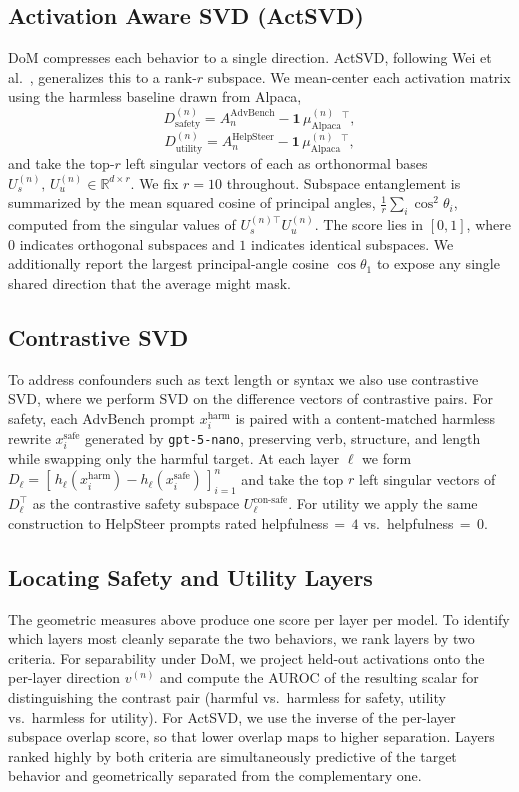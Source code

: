 \subsection{Activation Aware SVD (ActSVD)}
DoM compresses each behavior to a single direction. ActSVD,
following Wei et al.~\cite{wei2024brittleness}, generalizes this
to a rank-$r$ subspace. We mean-center each activation matrix
using the harmless baseline drawn from Alpaca,
\[
D^{(n)}_{\text{safety}} = A_n^{\text{AdvBench}}
   - \mathbf{1}\,\mu^{(n)}_{\text{Alpaca}}{}^{\!\top},
\]
\[
D^{(n)}_{\text{utility}} = A_n^{\text{HelpSteer}}
   - \mathbf{1}\,\mu^{(n)}_{\text{Alpaca}}{}^{\!\top},
\]
and take the top-$r$ left singular vectors of each as orthonormal
bases $U^{(n)}_{s},\, U^{(n)}_{u} \in \mathbb{R}^{d \times r}$. We
fix $r=10$ throughout. Subspace entanglement is summarized by the
mean squared cosine of principal angles,
$\frac{1}{r}\sum_{i} \cos^2 \theta_i$, computed from the singular
values of $U^{(n)\top}_{s} U^{(n)}_{u}$. The score lies in $[0,1]$,
where $0$ indicates orthogonal subspaces and $1$ indicates
identical subspaces. We additionally report the largest
principal-angle cosine $\cos \theta_1$ to expose any single shared
direction that the average might mask.

\subsection{Contrastive SVD}
To address confounders such as text length or syntax we also use contrastive SVD,
where we perform SVD on the difference vectors of contrastive pairs.
For safety, each AdvBench prompt $x_i^{\text{harm}}$ is paired with a content-matched
harmless rewrite $x_i^{\text{safe}}$ generated by \texttt{gpt-5-nano}, preserving
verb, structure, and length while swapping only the harmful target. At each
layer $\ell$ we form
$D_\ell = [\,h_\ell(x_i^{\text{harm}}) - h_\ell(x_i^{\text{safe}})\,]_{i=1}^{n}$
and take the top $r$ left singular vectors of $D_\ell^{\top}$ as the
contrastive safety subspace $U_\ell^{\text{con-safe}}$. For utility we apply the
same construction to HelpSteer prompts rated helpfulness$\,{=}\,4$ vs.\
helpfulness$\,{=}\,0$.


\subsection{Locating Safety and Utility Layers}
The geometric measures above produce one score per layer per
model. To identify which layers most cleanly separate the two
behaviors, we rank layers by two criteria. For separability
under DoM, we project held-out activations onto the per-layer
direction $v^{(n)}$ and compute the AUROC of the resulting scalar
for distinguishing the contrast pair (harmful vs.\ harmless for
safety, utility vs.\ harmless for utility). For ActSVD, we use
the inverse of the per-layer subspace overlap score, so that
lower overlap maps to higher separation. Layers ranked highly by
both criteria are simultaneously predictive of the target behavior
and geometrically separated from the complementary one.

